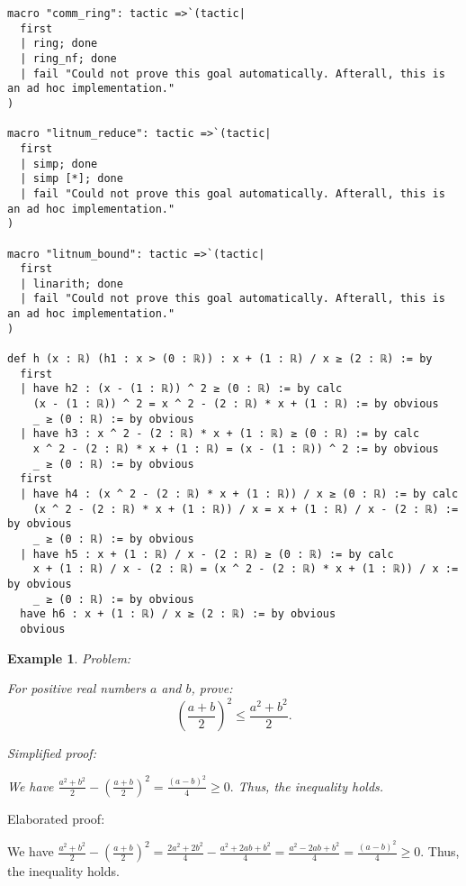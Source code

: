 \documentclass{article}
\newtheorem{example}{Example}
\begin{document}
\begin{tcolorbox}[colback=white!10, width=\linewidth]
\begin{lstlisting}[language=Lean4]
macro "comm_ring": tactic =>`(tactic|
  first
  | ring; done
  | ring_nf; done
  | fail "Could not prove this goal automatically. Afterall, this is an ad hoc implementation."
)

macro "litnum_reduce": tactic =>`(tactic|
  first
  | simp; done
  | simp [*]; done
  | fail "Could not prove this goal automatically. Afterall, this is an ad hoc implementation."
)

macro "litnum_bound": tactic =>`(tactic|
  first
  | linarith; done
  | fail "Could not prove this goal automatically. Afterall, this is an ad hoc implementation."
)

def h (x : ℝ) (h1 : x > (0 : ℝ)) : x + (1 : ℝ) / x ≥ (2 : ℝ) := by
  first
  | have h2 : (x - (1 : ℝ)) ^ 2 ≥ (0 : ℝ) := by calc
    (x - (1 : ℝ)) ^ 2 = x ^ 2 - (2 : ℝ) * x + (1 : ℝ) := by obvious
    _ ≥ (0 : ℝ) := by obvious
  | have h3 : x ^ 2 - (2 : ℝ) * x + (1 : ℝ) ≥ (0 : ℝ) := by calc
    x ^ 2 - (2 : ℝ) * x + (1 : ℝ) = (x - (1 : ℝ)) ^ 2 := by obvious
    _ ≥ (0 : ℝ) := by obvious
  first
  | have h4 : (x ^ 2 - (2 : ℝ) * x + (1 : ℝ)) / x ≥ (0 : ℝ) := by calc
    (x ^ 2 - (2 : ℝ) * x + (1 : ℝ)) / x = x + (1 : ℝ) / x - (2 : ℝ) := by obvious
    _ ≥ (0 : ℝ) := by obvious
  | have h5 : x + (1 : ℝ) / x - (2 : ℝ) ≥ (0 : ℝ) := by calc
    x + (1 : ℝ) / x - (2 : ℝ) = (x ^ 2 - (2 : ℝ) * x + (1 : ℝ)) / x := by obvious
    _ ≥ (0 : ℝ) := by obvious
  have h6 : x + (1 : ℝ) / x ≥ (2 : ℝ) := by obvious
  obvious

\end{lstlisting}
\end{tcolorbox}


\begin{example}
Problem:
\begin{tcolorbox}[colback=yellow!10, width=\linewidth]
For positive real numbers $a$ and $b$, prove:
    $$\left(\frac{a+b}{2}\right)^2 \leq \frac{a^2+b^2}{2}.$$
\end{tcolorbox}

Simplified proof:
\begin{tcolorbox}[colback=blue!10, width=\linewidth]
We have
$ \frac{a^2+b^2}{2} - \left(\frac{a+b}{2}\right)^2 = \frac{(a-b)^2}{4} \ge 0. $
Thus, the inequality holds.
\end{tcolorbox}
\end{example}

Elaborated proof:
\begin{tcolorbox}[colback=green!10, width=\linewidth]
We have
$ \frac{a^2+b^2}{2} - \left(\frac{a+b}{2}\right)^2 = \frac{2a^2+2b^2}{4} - \frac{a^2+2ab+b^2}{4} = \frac{a^2-2ab+b^2}{4} = \frac{(a-b)^2}{4} \ge 0. $
Thus, the inequality holds.
\end{tcolorbox}
\end{document}
